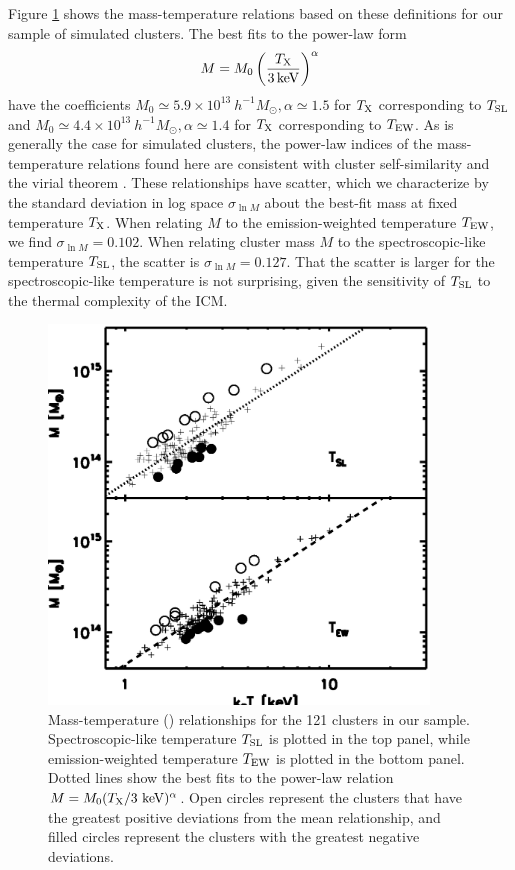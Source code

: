 \documentclass{aastex} \usepackage{natbib}
\begin{document}
Figure \ref{fig:mass-temp} shows the mass-temperature relations based
on these definitions for our sample of simulated clusters.  The best
fits to the power-law form
\begin{equation}
  M = M_0 \left( \frac {T_{\rm X}} {3 \, {\rm keV}} \right)^\alpha
  \label{eq:mass-temp}
\end{equation}
have the coefficients $M_0 \simeq 5.9 \times 10^{13}\ h^{-1}
M_{\odot}, \alpha \simeq 1.5$ for $T_{\rm X}$ corresponding to $T_{\rm SL}$ and
$M_0 \simeq 4.4 \times 10^{13}\ h^{-1} M_{\odot}, \alpha \simeq 1.4$
for $T_{\rm X}$ corresponding to $T_{\rm EW}$.  As is generally the case for
simulated clusters, the power-law indices of the mass-temperature
relations found here are consistent with cluster self-similarity and
the virial theorem \citep{1986MNRAS.222..323K,1995MNRAS.275..720N}.
These relationships have scatter, which we characterize by the
standard deviation in log space $\sigma_{\ln M}$ about the best-fit
mass at fixed temperature $T_{\rm X}$.  When relating $M$ to the
emission-weighted temperature $T_{\rm EW}$, we find $\sigma_{\ln M} =
0.102$.  When relating cluster mass $M$ to the spectroscopic-like
temperature $T_{\rm SL}$, the scatter is $\sigma_{\ln M} = 0.127$.  That the
scatter is larger for the spectroscopic-like temperature is not
surprising, given the sensitivity of $T_{\rm SL}$ to the thermal complexity
of the ICM.

\begin{figure}[b]
  \centering
  \includegraphics[width=0.9\textwidth]{f1.eps}
  \caption{Mass-temperature (\mtx) relationships for the 121 clusters
    in our sample.  Spectroscopic-like temperature $T_{\rm SL}$ is plotted
    in the top panel, while emission-weighted temperature $T_{\rm EW}$ is
    plotted in the bottom panel. Dotted lines show the best fits to
    the power-law relation $M = M_0 (T_{\rm X}/3\ {\rm keV})^{\alpha}$.
    Open circles represent the clusters that have the greatest
    positive deviations from the mean relationship, and filled circles
    represent the clusters with the greatest negative deviations.}
  \label{fig:mass-temp}
\end{figure}
\end{document}
